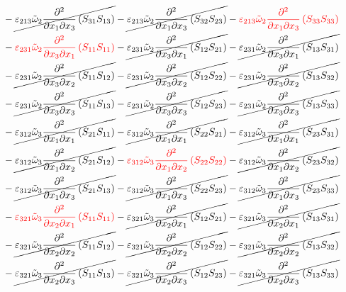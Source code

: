 \begin{equation}
\begin{split}
&		-\cancel{\varepsilon_{213}\tilde{\omega}_{2}\pdv{}{x_{1}}{x_{3}}\left(S_{31}S_{13}\right)}
		-\cancel{\varepsilon_{213}\tilde{\omega}_{2}\pdv{}{x_{1}}{x_{3}}\left(S_{32}S_{23}\right)}
		-{\color{red}\varepsilon_{213}\tilde{\omega}_{2}\pdv{}{x_{1}}{x_{3}}\left(S_{33}S_{33}\right)}\\
&		-{\color{red}\varepsilon_{231}\tilde{\omega}_{2}\pdv{}{x_{3}}{x_{1}}\left(S_{11}S_{11}\right)}
		-\cancel{\varepsilon_{231}\tilde{\omega}_{2}\pdv{}{x_{3}}{x_{1}}\left(S_{12}S_{21}\right)}
		-\cancel{\varepsilon_{231}\tilde{\omega}_{2}\pdv{}{x_{3}}{x_{1}}\left(S_{13}S_{31}\right)}\\
&		-\cancel{\varepsilon_{231}\tilde{\omega}_{2}\pdv{}{x_{3}}{x_{2}}\left(S_{11}S_{12}\right)}
		-\cancel{\varepsilon_{231}\tilde{\omega}_{2}\pdv{}{x_{3}}{x_{2}}\left(S_{12}S_{22}\right)}
		-\cancel{\varepsilon_{231}\tilde{\omega}_{2}\pdv{}{x_{3}}{x_{2}}\left(S_{13}S_{32}\right)}\\
&		-\cancel{\varepsilon_{231}\tilde{\omega}_{2}\pdv{}{x_{3}}{x_{3}}\left(S_{11}S_{13}\right)}
		-\cancel{\varepsilon_{231}\tilde{\omega}_{2}\pdv{}{x_{3}}{x_{3}}\left(S_{12}S_{23}\right)}
		-\cancel{\varepsilon_{231}\tilde{\omega}_{2}\pdv{}{x_{3}}{x_{3}}\left(S_{13}S_{33}\right)}\\
&		-\cancel{\varepsilon_{312}\tilde{\omega}_{3}\pdv{}{x_{1}}{x_{1}}\left(S_{21}S_{11}\right)}
		-\cancel{\varepsilon_{312}\tilde{\omega}_{3}\pdv{}{x_{1}}{x_{1}}\left(S_{22}S_{21}\right)}
		-\cancel{\varepsilon_{312}\tilde{\omega}_{3}\pdv{}{x_{1}}{x_{1}}\left(S_{23}S_{31}\right)}\\
&		-\cancel{\varepsilon_{312}\tilde{\omega}_{3}\pdv{}{x_{1}}{x_{2}}\left(S_{21}S_{12}\right)}
		-{\color{red}\varepsilon_{312}\tilde{\omega}_{3}\pdv{}{x_{1}}{x_{2}}\left(S_{22}S_{22}\right)}
		-\cancel{\varepsilon_{312}\tilde{\omega}_{3}\pdv{}{x_{1}}{x_{2}}\left(S_{23}S_{32}\right)}\\
&		-\cancel{\varepsilon_{312}\tilde{\omega}_{3}\pdv{}{x_{1}}{x_{3}}\left(S_{21}S_{13}\right)}
		-\cancel{\varepsilon_{312}\tilde{\omega}_{3}\pdv{}{x_{1}}{x_{3}}\left(S_{22}S_{23}\right)}
		-\cancel{\varepsilon_{312}\tilde{\omega}_{3}\pdv{}{x_{1}}{x_{3}}\left(S_{23}S_{33}\right)}\\
&		-{\color{red}\varepsilon_{321}\tilde{\omega}_{3}\pdv{}{x_{2}}{x_{1}}\left(S_{11}S_{11}\right)}
		-\cancel{\varepsilon_{321}\tilde{\omega}_{3}\pdv{}{x_{2}}{x_{1}}\left(S_{12}S_{21}\right)}
		-\cancel{\varepsilon_{321}\tilde{\omega}_{3}\pdv{}{x_{2}}{x_{1}}\left(S_{13}S_{31}\right)}\\
&		-\cancel{\varepsilon_{321}\tilde{\omega}_{3}\pdv{}{x_{2}}{x_{2}}\left(S_{11}S_{12}\right)}
		-\cancel{\varepsilon_{321}\tilde{\omega}_{3}\pdv{}{x_{2}}{x_{2}}\left(S_{12}S_{22}\right)}
		-\cancel{\varepsilon_{321}\tilde{\omega}_{3}\pdv{}{x_{2}}{x_{2}}\left(S_{13}S_{32}\right)}\\
&		-\cancel{\varepsilon_{321}\tilde{\omega}_{3}\pdv{}{x_{2}}{x_{3}}\left(S_{11}S_{13}\right)}
		-\cancel{\varepsilon_{321}\tilde{\omega}_{3}\pdv{}{x_{2}}{x_{3}}\left(S_{12}S_{23}\right)}
		-\cancel{\varepsilon_{321}\tilde{\omega}_{3}\pdv{}{x_{2}}{x_{3}}\left(S_{13}S_{33}\right)}\\
	\end{split}
\end{equation}
